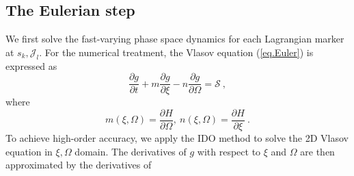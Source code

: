 \subsection{The Eulerian step}
We first solve the fast-varying phase space dynamics for each Lagrangian marker at $s_k,\mathcal{J}_l$.
For the numerical treatment, the Vlasov equation (\ref{eq.Euler}) is expressed as
\begin{equation}\label{eq.Euler2}
    \frac{\partial g}{\partial t} + m \frac{\partial  g}{\partial \xi} - n \frac{\partial  g}{\partial \Omega}= \mathcal{S}~,
\end{equation}
where 
\begin{equation}
        m(\xi,\Omega) = \frac{\partial H}{\partial \Omega},~ n(\xi,\Omega) = \frac{\partial H}{\partial \xi}~.
\end{equation}
To achieve high-order accuracy, we apply the IDO method \cite{imadera2009} to solve the 2D Vlasov equation in $\xi,\Omega$ domain.
The derivatives of $g$ with respect to $\xi$ and $\Omega$ are then approximated by 
the derivatives of 
